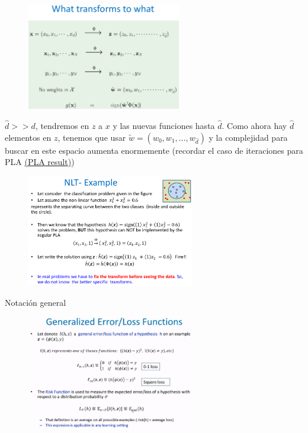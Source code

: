 \documentclass[11pt,a4paper]{article}
\theoremstyle{definition}
\begin{document}
	\begin{figure}[H]
		\centering
		\includegraphics[width=0.6\textwidth]{images/what_trans_to_what}
	\end{figure}
	$\hat d >> d$, tendremos en $z$ a $x$ y las nuevas funciones hasta $\hat d$. Como ahora hay $\hat d$ elementos en $z$, tenemos que usar $\tilde w = (w_0,w_1,\ldots, w_{\hat d})$ y la complejidad para buscar en este espacio aumenta enormemente (recordar el caso de iteraciones para PLA \hyperlink{plaResult}{(PLA result)})
	
	\begin{figure}[H]
		\centering
		\includegraphics[width=0.65\textwidth]{images/nlt_example}
	\end{figure}
	
	Notación general
	\begin{figure}[H]
		\centering
		\includegraphics[width=0.65\textwidth]{images/notation_loss}
	\end{figure}
	
\end{document}
